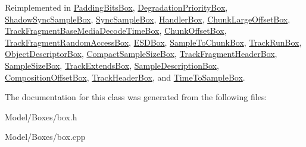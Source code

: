 Reimplemented in \hyperlink{class_padding_bits_box_ab355f0ebfa4a84ef4a2737bc9c264004}{Padding\-Bits\-Box}, \hyperlink{class_degradation_priority_box_a97f91434e74e47bc9e10ff9a21dd3023}{Degradation\-Priority\-Box}, \hyperlink{class_shadow_sync_sample_box_ab6644ef80649f21ac098f0d78904e9df}{Shadow\-Sync\-Sample\-Box}, \hyperlink{class_sync_sample_box_a9d3ab6e8730ca0cca633b7920e131413}{Sync\-Sample\-Box}, \hyperlink{class_handler_box_a77b90ca0801113aed5f6272035da0a04}{Handler\-Box}, \hyperlink{class_chunk_large_offset_box_acdadc159668e5e6ab286dbb840877f31}{Chunk\-Large\-Offset\-Box}, \hyperlink{class_track_fragment_base_media_decode_time_box_acf81a553080878b3066b24fc00b14f9e}{Track\-Fragment\-Base\-Media\-Decode\-Time\-Box}, \hyperlink{class_chunk_offset_box_a1c26ce6ada45f85c65761ed27f382848}{Chunk\-Offset\-Box}, \hyperlink{class_track_fragment_random_access_box_afeb1c2b67373428008a209cf01f6df10}{Track\-Fragment\-Random\-Access\-Box}, \hyperlink{class_e_s_d_box_a9e610dce6e72228e08fcbdfca0177c85}{E\-S\-D\-Box}, \hyperlink{class_sample_to_chunk_box_a298e53e6d563e66b7b910f99caeac0c3}{Sample\-To\-Chunk\-Box}, \hyperlink{class_track_run_box_a26fb4feae53dac2aa48caaa39ccceb81}{Track\-Run\-Box}, \hyperlink{class_object_descriptor_box_ae01792b840bd4547ecc0aba4ee665998}{Object\-Descriptor\-Box}, \hyperlink{class_compact_sample_size_box_a10c8ab4b452dd5c2d58e2c744ffac884}{Compact\-Sample\-Size\-Box}, \hyperlink{class_track_fragment_header_box_a6868fba2faed6053702b3c70751195e2}{Track\-Fragment\-Header\-Box}, \hyperlink{class_sample_size_box_a3cdb87618bba15d0c9e8cea9dde19ee5}{Sample\-Size\-Box}, \hyperlink{class_track_extends_box_acaa1a49911d86e5ca02ce2038398ff5d}{Track\-Extends\-Box}, \hyperlink{class_sample_description_box_a47754fb62da6522d13ff58de1ede0f09}{Sample\-Description\-Box}, \hyperlink{class_composition_offset_box_a6ed0d84212f70f61a021b39e1114c0fb}{Composition\-Offset\-Box}, \hyperlink{class_track_header_box_a7bc710a767026e2128ae46a1d3302778}{Track\-Header\-Box}, and \hyperlink{class_time_to_sample_box_a44c8086a9f61fb72f9549e8f997be7b9}{Time\-To\-Sample\-Box}.



The documentation for this class was generated from the following files\-:\begin{DoxyCompactItemize}
\item 
Model/\-Boxes/box.\-h\item 
Model/\-Boxes/box.\-cpp\end{DoxyCompactItemize}
